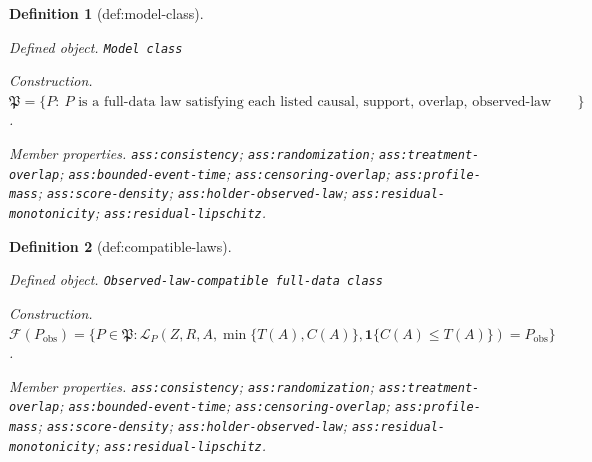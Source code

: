 \documentclass{article}
\newtheorem{definition}{Definition}
\begin{document}
\begin{definition}[def:model-class]\label{def:model-class}
\par\smallskip\noindent\emph{Defined object.} \texttt{Model class}
\par\smallskip\noindent\emph{Construction.} \(\mathfrak P=\{P:\ P\text{ is a full-data law satisfying each listed causal, support, overlap, observed-law regularity, and residual-shape property}\}\).
\par\smallskip\noindent\emph{Member properties.} \texttt{ass:\allowbreak{}consistency}; \texttt{ass:\allowbreak{}randomization}; \texttt{ass:\allowbreak{}treatment-\allowbreak{}overlap}; \texttt{ass:\allowbreak{}bounded-\allowbreak{}event-\allowbreak{}time}; \texttt{ass:\allowbreak{}censoring-\allowbreak{}overlap}; \texttt{ass:\allowbreak{}profile-\allowbreak{}mass}; \texttt{ass:\allowbreak{}score-\allowbreak{}density}; \texttt{ass:\allowbreak{}holder-\allowbreak{}observed-\allowbreak{}law}; \texttt{ass:\allowbreak{}residual-\allowbreak{}monotonicity}; \texttt{ass:\allowbreak{}residual-\allowbreak{}lipschitz}.
\end{definition}

\begin{definition}[def:compatible-laws]\label{def:compatible-laws}
\par\smallskip\noindent\emph{Defined object.} \texttt{Observed-\allowbreak{}law-\allowbreak{}compatible full-\allowbreak{}data class}
\par\smallskip\noindent\emph{Construction.} \(\mathcal F(P_{\mathrm{obs}})=\{P\in\mathfrak P:\mathcal L_P(Z,R,A,\min\{T(A),C(A)\},\mathbf 1\{C(A)\le T(A)\})=P_{\mathrm{obs}}\}\).
\par\smallskip\noindent\emph{Member properties.} \texttt{ass:\allowbreak{}consistency}; \texttt{ass:\allowbreak{}randomization}; \texttt{ass:\allowbreak{}treatment-\allowbreak{}overlap}; \texttt{ass:\allowbreak{}bounded-\allowbreak{}event-\allowbreak{}time}; \texttt{ass:\allowbreak{}censoring-\allowbreak{}overlap}; \texttt{ass:\allowbreak{}profile-\allowbreak{}mass}; \texttt{ass:\allowbreak{}score-\allowbreak{}density}; \texttt{ass:\allowbreak{}holder-\allowbreak{}observed-\allowbreak{}law}; \texttt{ass:\allowbreak{}residual-\allowbreak{}monotonicity}; \texttt{ass:\allowbreak{}residual-\allowbreak{}lipschitz}.
\end{definition}
\end{document}
